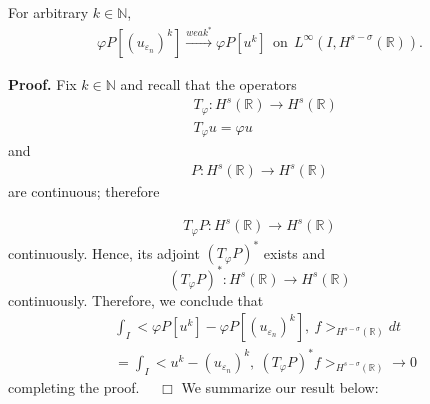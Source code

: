 \documentclass{beamer}
\newcommand{\rr}{\mathbb{R}}
\newcommand{\ee}{\varepsilon}
\newcommand{\vp}{\varphi}
\begin{document}
  \begin{frame}
		\vskip0.1in
		\begin{lemma}
			\label{hhlem:crit-conv}
			For arbitrary $k \in \mathbb{N}$,
			\begin{equation}
				\begin{split}
					\varphi P [(u_{\ee_n})^k] \xrightarrow{weak^*}
					\varphi P [u^k] \ \ \text{on} \ \ L^\infty(I,
					H^{s-\sigma}(\rr)).
					\label{hhcrit-conv-est}
				\end{split}
			\end{equation}
		\end{lemma}
		{\bf Proof.} 
		Fix $k \in \mathbb{N}$ and recall that the operators 
		\begin{equation*}
			\begin{split}
			 & T_\varphi: H^s(\rr) \to H^s(\rr)\\
			 & T_\varphi u = \varphi u
		\end{split}
	\end{equation*}
and 
\begin{equation*}
	\begin{split}
		P:H^s(\rr) \to H^s(\rr)
	\end{split}
\end{equation*}
	are continuous; therefore 
\end{frame}
\begin{frame}
	\begin{equation*}
		\begin{split}
			T_\vp P: H^s(\rr) \to H^s(\rr)
		\end{split}
	\end{equation*}
	continuously. Hence, its adjoint  $(T_\varphi P)^*$
	exists and
		\begin{equation*}
			(T_\varphi P)^*: H^s(\rr) \to H^s(\rr) 
		\end{equation*}
		continuously. Therefore, we conclude that
		\begin{equation}
			\label{widpseudo}
			\begin{split}
				& \int_I <\varphi P[u^k] - \varphi
				P [(u_{\ee_n})^k],\  f>_{H^{s-\sigma }(\rr)} dt
				\\
				&= \int_I <u^k - 
				 (u_{\ee_n})^k, \ (T_\vp P)^* f>_{H^{s-\sigma }(\rr)} \to 0
			\end{split}
		\end{equation}
		completing the proof. $\quad \Box$
		\vskip0.1in
		We summarize our result below:
  \end{frame}
\end{document}
